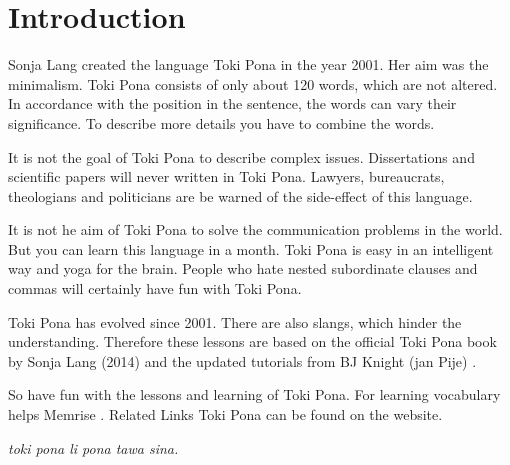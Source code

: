 \section{Introduction}
%
Sonja Lang created the language Toki Pona in the year 2001. 
Her aim was the minimalism. 
Toki Pona consists of only about 120 words, which are not altered. 
In accordance with the position in the sentence, the words can vary their significance. 
To describe more details you have to combine the words.

It is not the goal of Toki Pona to describe complex issues. 
Dissertations and scientific papers will never written in Toki Pona. 
Lawyers, bureaucrats, theologians and politicians are be warned of the side-effect of this language.

It is not he aim of Toki Pona to solve the communication problems in the world. 
But you can learn this language in a month. 
Toki Pona is easy in an intelligent way and yoga for the brain. 
People who hate nested subordinate clauses and commas will certainly have fun with Toki Pona.

Toki Pona has evolved since 2001. 
There are also slangs, which hinder the understanding. 
Therefore these lessons are based on the official Toki Pona book \cite{www:tokipona.org} by Sonja Lang (2014) and the updated tutorials from BJ Knight (jan Pije) \cite{www:Pije:01}.

So have fun with the lessons and learning of Toki Pona. 
For learning vocabulary helps Memrise \cite{www:memrise:01}. Related Links Toki Pona can be found on the website\cite{www:rowa:01}.

\textit{toki pona li pona tawa sina.}
%
